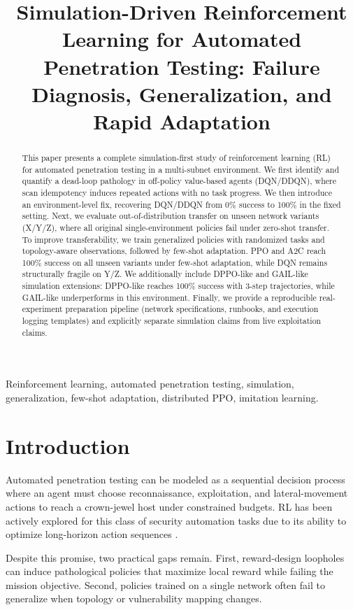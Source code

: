 \documentclass[conference]{IEEEtran}
\title{Simulation-Driven Reinforcement Learning for Automated Penetration Testing:
Failure Diagnosis, Generalization, and Rapid Adaptation}
\author{\IEEEauthorblockN{Anonymous Authors}}
\begin{document}
\maketitle

\begin{abstract}
This paper presents a complete simulation-first study of reinforcement learning (RL) for automated penetration testing in a multi-subnet environment. We first identify and quantify a dead-loop pathology in off-policy value-based agents (DQN/DDQN), where scan idempotency induces repeated actions with no task progress. We then introduce an environment-level fix, recovering DQN/DDQN from 0\% success to 100\% in the fixed setting. Next, we evaluate out-of-distribution transfer on unseen network variants (X/Y/Z), where all original single-environment policies fail under zero-shot transfer. To improve transferability, we train generalized policies with randomized tasks and topology-aware observations, followed by few-shot adaptation. PPO and A2C reach 100\% success on all unseen variants under few-shot adaptation, while DQN remains structurally fragile on Y/Z. We additionally include DPPO-like and GAIL-like simulation extensions: DPPO-like reaches 100\% success with 3-step trajectories, while GAIL-like underperforms in this environment. Finally, we provide a reproducible real-experiment preparation pipeline (network specifications, runbooks, and execution logging templates) and explicitly separate simulation claims from live exploitation claims.
\end{abstract}

\begin{IEEEkeywords}
Reinforcement learning, automated penetration testing, simulation, generalization, few-shot adaptation, distributed PPO, imitation learning.
\end{IEEEkeywords}

\section{Introduction}
Automated penetration testing can be modeled as a sequential decision process where an agent must choose reconnaissance, exploitation, and lateral-movement actions to reach a crown-jewel host under constrained budgets. RL has been actively explored for this class of security automation tasks due to its ability to optimize long-horizon action sequences \cite{sutton2018,moerland2023}.

Despite this promise, two practical gaps remain. First, reward-design loopholes can induce pathological policies that maximize local reward while failing the mission objective. Second, policies trained on a single network often fail to generalize when topology or vulnerability mapping changes.
\end{document}

